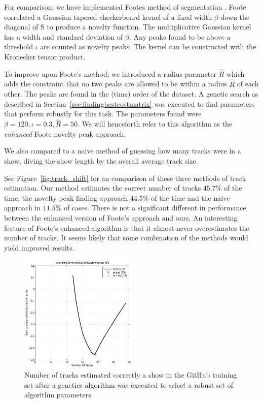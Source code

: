 \documentclass[twocolumn]{article}
\begin{document}
For comparison; we have implemented Footes method of segmentation \citep{foote2003media}. Foote correlated a Gaussian tapered checkerboard kernel of a fixed width $\beta$ down the diagonal of S to produce a novelty function. The multiplicative Gaussian kernel has a width and standard deviation of $\beta$.  Any peaks found to be above a threshold $\iota$ are counted as novelty peaks. The kernel can be constructed with the Kronecker tensor product.

To improve upon Foote's method; we introduced a radius parameter $\hat R$ which adds the constraint that no two peaks are allowed to be within a radius $\hat R$ of each other. The peaks are found in the (time) order of the dataset. A genetic search as described in Section~\ref{sec:findingbestcostmatrix} was executed to find parameters that perform robustly for this task. The parameters found were $\beta=120, \iota=0.3, \hat R=50$. We will henceforth refer to this algorithm as the \textit{enhanced} Foote novelty peak approach.

We also compared to a naive method of guessing how many tracks were in a show, diving the show length by the overall average track size.

See Figure~\ref{fig:track_shift} for an comparison of these three methods of track estimation. Our method estimates the correct number of tracks $45.7$\% of the time, the novelty peak finding approach $44.5$\% of the time and the naive approach in $11.5$\% of cases. There is not a significant different in performance between the enhanced version of Foote's approach and ours. An interesting feature of Foote's enhanced algorithm is that it almost never overestimates the number of tracks. It seems likely that some combination of the methods would yield improved results. 


\begin{figure}
	\centering
	\includegraphics[width=0.5\textwidth]{images/trackestimate}
	\caption{Number of tracks estimated correctly a show in the GitHub training set after a genetics algorithm was executed to select a robust set of algorithm parameters.}
	\label{fig:github_trackestimation}
\end{figure}
\end{document}
